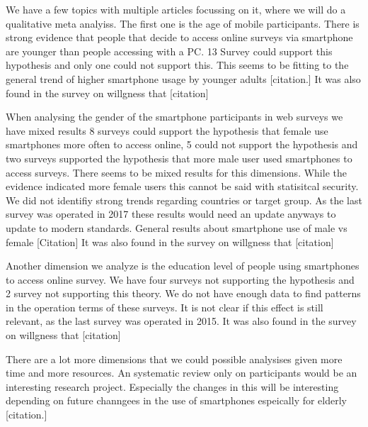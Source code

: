 We have a few topics with multiple articles focussing on it, where we will do a qualitative meta analyiss. The first one is the age of mobile participants. There is strong evidence that people that decide to access online surveys via smartphone are younger than people accessing with a PC. 13 Survey could support this hypothesis and only one could not support this. This seems to be fitting to the general trend of higher smartphone usage by younger adults [citation.]
It was also found in the survey on willgness that [citation]

When analysing the gender of the smartphone participants in web surveys we have mixed results 8 surveys could support the hypothesis that female use smartphones more often to access online, 5 could not support the hypothesis and two surveys supported the hypothesis that more male user used smartphones to access surveys. There seems to be mixed results for this dimensions. While the evidence indicated more female users this cannot be said with statisitcal security. We did not identifiy strong trends regarding countries or target group. As the last survey was operated in 2017 these results would need an update anyways to update to modern standards. General results about smartphone use of male vs female [Citation]
It was also found in the survey on willgness that [citation]


Another dimension we analyze is the education level of people using smartphones to access online survey. We have four surveys not supporting the hypothesis and 2 survey not supporting this theory. We do not have enough data to find patterns in the operation terms of these surveys. It is not clear if this effect is still relevant, as the last survey was operated in 2015.
It was also found in the survey on willgness that [citation]


There are a lot more dimensions that we could possible analysises given more time and more resources. An systematic review only on participants would be an interesting research project. Especially the changes in this will be interesting depending on future channgees in the use of smartphones espeically for elderly [citation.]

